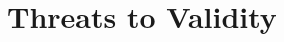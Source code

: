 \documentclass[10pt,conference]{IEEEtran}
\newcommand{\todoc}[2]{{\textcolor{#1}{\textbf{[#2]}}}}
\newcommand{\shi}[1]{\todoc{orange}{Shi: #1}}
\newcommand{\approach}{{LongCodeZip}\xspace} %
\begin{document}




\section{Threats to Validity}

\end{document}
